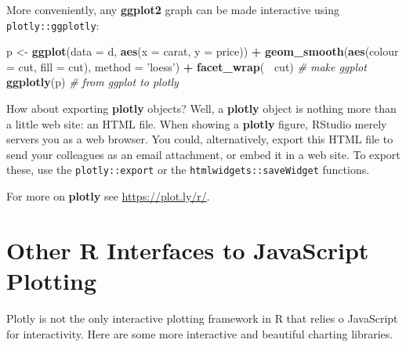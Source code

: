 \documentclass[]{book}
\newenvironment{Shaded}{\begin{snugshade}}{\end{snugshade}}
\newcommand{\CommentTok}[1]{\textcolor[rgb]{0.56,0.35,0.01}{\textit{#1}}}
\newcommand{\DataTypeTok}[1]{\textcolor[rgb]{0.13,0.29,0.53}{#1}}
\newcommand{\KeywordTok}[1]{\textcolor[rgb]{0.13,0.29,0.53}{\textbf{#1}}}
\newcommand{\NormalTok}[1]{#1}
\newcommand{\OperatorTok}[1]{\textcolor[rgb]{0.81,0.36,0.00}{\textbf{#1}}}
\newcommand{\StringTok}[1]{\textcolor[rgb]{0.31,0.60,0.02}{#1}}
\theoremstyle{definition}
\theoremstyle{definition}
\theoremstyle{definition}
\theoremstyle{remark}
\begin{document}
More conveniently, any \textbf{ggplot2} graph can be made interactive using \texttt{plotly::ggplotly}:

\begin{Shaded}
\begin{Highlighting}[]
\NormalTok{p <-}\StringTok{ }\KeywordTok{ggplot}\NormalTok{(}\DataTypeTok{data =}\NormalTok{ d, }\KeywordTok{aes}\NormalTok{(}\DataTypeTok{x =}\NormalTok{ carat, }\DataTypeTok{y =}\NormalTok{ price)) }\OperatorTok{+}
\StringTok{  }\KeywordTok{geom_smooth}\NormalTok{(}\KeywordTok{aes}\NormalTok{(}\DataTypeTok{colour =}\NormalTok{ cut, }\DataTypeTok{fill =}\NormalTok{ cut), }\DataTypeTok{method =} \StringTok{'loess'}\NormalTok{) }\OperatorTok{+}\StringTok{ }
\StringTok{  }\KeywordTok{facet_wrap}\NormalTok{(}\OperatorTok{~}\StringTok{ }\NormalTok{cut) }\CommentTok{# make ggplot}
\KeywordTok{ggplotly}\NormalTok{(p) }\CommentTok{# from ggplot to plotly}
\end{Highlighting}
\end{Shaded}

\hypertarget{htmlwidget-abd5ef66e818cfb51399}{}

How about exporting \textbf{plotly} objects?
Well, a \textbf{plotly} object is nothing more than a little web site: an HTML file.
When showing a \textbf{plotly} figure, RStudio merely servers you as a web browser.
You could, alternatively, export this HTML file to send your colleagues as an email attachment, or embed it in a web site.
To export these, use the \texttt{plotly::export} or the \texttt{htmlwidgets::saveWidget} functions.

For more on \textbf{plotly} see \url{https://plot.ly/r/}.

\hypertarget{other-r-interfaces-to-javascript-plotting}{%
\section{Other R Interfaces to JavaScript Plotting}\label{other-r-interfaces-to-javascript-plotting}}

Plotly is not the only interactive plotting framework in R that relies o JavaScript for interactivity.
Here are some more interactive and beautiful charting libraries.
\end{document}
